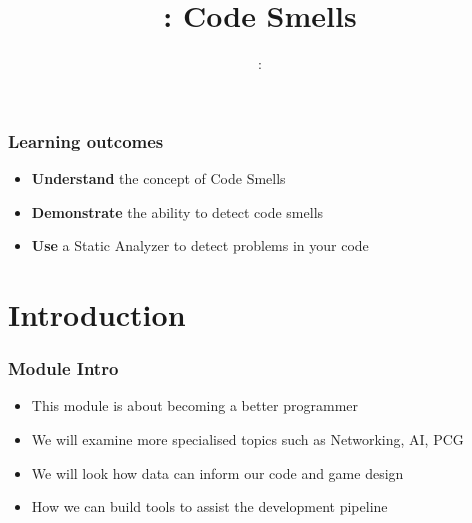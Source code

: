 \usepackage{../../beamerthemeFalmouthGamesAcademy}
\usepackage{multimedia}
\graphicspath{ {../../} }


\usepackage[normalem]{ulem}
\usepackage{wasysym}

\usepackage{pdfpages}

\usetikzlibrary{arrows,automata}



\begin{frame}
\title{\sessionnumber: Code Smells}
\subtitle{\modulecode: \moduletitle}

\frame{\titlepage} 

\begin{frame}
	\frametitle{Learning outcomes}
	\begin{itemize}
		\item \textbf{Understand} the concept of Code Smells
		\item \textbf{Demonstrate} the ability to detect code smells
		\item \textbf{Use} a Static Analyzer to detect problems in your code
	\end{itemize}
\end{frame}

\section{Introduction}

\begin{frame}
	\frametitle{Module Intro}
	\begin{itemize}
		\item This module is about becoming a better programmer
		\item We will examine more specialised topics such as Networking, AI, PCG
		\item We will look how data can inform our code and game design
		\item How we can build tools to assist the development pipeline
	\end{itemize}
\end{frame}


\end{frame}
